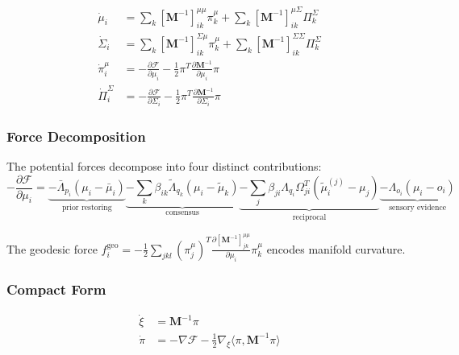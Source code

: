 \documentclass[12pt]{article}
\begin{document}
\begin{align}
\dot{\mu}_i &= \sum_k [\mathbf{M}^{-1}]_{ik}^{\mu\mu}\pi_k^\mu + \sum_k [\mathbf{M}^{-1}]_{ik}^{\mu\Sigma}\Pi_k^\Sigma \label{eq:hamilton_mu} \\[6pt]
\dot{\Sigma}_i &= \sum_k [\mathbf{M}^{-1}]_{ik}^{\Sigma\mu}\pi_k^\mu + \sum_k [\mathbf{M}^{-1}]_{ik}^{\Sigma\Sigma}\Pi_k^\Sigma \label{eq:hamilton_sigma} \\[6pt]
\dot{\pi}_i^\mu &= -\frac{\partial \mathcal{F}}{\partial \mu_i} - \frac{1}{2}\pi^T\frac{\partial \mathbf{M}^{-1}}{\partial \mu_i}\pi \label{eq:hamilton_pi_mu} \\[6pt]
\dot{\Pi}_i^\Sigma &= -\frac{\partial \mathcal{F}}{\partial \Sigma_i} - \frac{1}{2}\pi^T\frac{\partial \mathbf{M}^{-1}}{\partial \Sigma_i}\pi \label{eq:hamilton_pi_sigma}
\end{align}

\subsubsection{Force Decomposition}

The potential forces decompose into four distinct contributions:
\begin{equation}
\boxed{
-\frac{\partial \mathcal{F}}{\partial \mu_i} = \underbrace{-\bar{\Lambda}_{p_i}(\mu_i - \bar{\mu}_i)}_{\text{prior restoring}} \underbrace{- \sum_k \beta_{ik}\tilde{\Lambda}_{q_k}(\mu_i - \tilde{\mu}_k)}_{\text{consensus}} \underbrace{- \sum_j \beta_{ji}\Lambda_{q_i}\Omega_{ji}^T(\tilde{\mu}_i^{(j)} - \mu_j)}_{\text{reciprocal}} \underbrace{- \Lambda_{o_i}(\mu_i - o_i)}_{\text{sensory evidence}}
}
\label{eq:force_decomposition}
\end{equation}

The geodesic force $f_i^{\text{geo}} = -\frac{1}{2}\sum_{jkl}(\pi_j^\mu)^T\frac{\partial[\mathbf{M}^{-1}]_{jk}^{\mu\mu}}{\partial \mu_i}\pi_k^\mu$ encodes manifold curvature.

\subsubsection{Compact Form}

\begin{equation}
\boxed{
\begin{aligned}
\dot{\xi} &= \mathbf{M}^{-1}\pi \\
\dot{\pi} &= -\nabla\mathcal{F} - \frac{1}{2}\nabla_\xi\langle\pi, \mathbf{M}^{-1}\pi\rangle
\end{aligned}
}
\end{equation}
\end{document}
